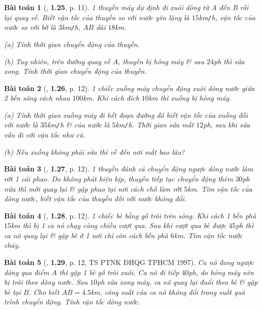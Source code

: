 \documentclass{article}
\numberwithin{equation}{section}
\newtheorem{baitoan}{Bài toán}[section]
\begin{document}
\begin{baitoan}[\cite{Van2022}, \textbf{1.25}, p. 11]
	1 thuyền máy dự định đi xuôi dòng từ A đến B rồi lại quay về. Biết vận tốc của thuyền so với nước yên lặng là $15$\emph{km\texttt{/}h}, vận tốc của nước so với bờ là $3$\emph{km\texttt{/}h}, $AB$ dài $18$\emph{km}.
	\begin{enumerate*}
		\item[(a)] Tính thời gian chuyển động của thuyền.
		\item[(b)] Tuy nhiên, trên đường quay về $A$, thuyền bị hỏng máy \& sau $24$\emph{ph} thì sửa xong. Tính thời gian chuyển động của thuyền.
	\end{enumerate*}
\end{baitoan}

\begin{baitoan}[\cite{Van2022}, \textbf{1.26}, p. 12]
	1 chiếc xuồng máy chuyển động xuôi dòng nước giữa 2 bến sông cách nhau $100$\emph{km}. Khi cách đích $10$\emph{km} thì xuồng bị hỏng máy.
	\begin{enumerate*}
		\item[(a)] Tính thời gian xuồng máy đi hết đoạn đường đó biết vận tốc của xuồng đối với nước là $35$\emph{km\texttt{/}h} \& của nước là $5$\emph{km\texttt{/}h}. Thời gian sửa mất $12$\emph{ph}, sau khi sửa vẫn đi với vận tốc như cũ.
		\item[(b)] Nếu xuồng không phải sửa thì về đến nơi mất bao lâu?
	\end{enumerate*}
\end{baitoan}

\begin{baitoan}[\cite{Van2022}, \textbf{1.27}, p. 12]
	1 thuyền đánh cá chuyển động ngược dòng nước làm rớt 1 cái phao. Do không phát hiện kịp, thuyền tiếp tục chuyển động thêm $30$\emph{ph} nữa thì mới quay lại \& gặp phao tại nơi cách chỗ làm rớt $5$\emph{km}. Tìm vận tốc của dòng nước, biết vận tốc của thuyền đối với nước không đổi.
\end{baitoan}

\begin{baitoan}[\cite{Van2022}, \textbf{1.28}, p. 12]
	1 chiếc bè bằng gỗ trôi trên sông. Khi cách 1 bến phà $15$\emph{km} thì bị 1 ca nô chạy cùng chiều vượt qua. Sau khi vượt qua bè được $45$\emph{ph} thì ca nô quay lại \& gặp bè ở 1 nơi chỉ còn cách bến phà $6$\emph{km}. Tìm vận tốc nước chảy.
\end{baitoan}

\begin{baitoan}[\cite{Van2022}, \textbf{1.29}, p. 12, TS PTNK ĐHQG TPHCM 1997]
	Ca nô đang ngược dòng qua điểm $A$ thì gặp 1 bè gỗ trôi xuôi. Ca nô đi tiếp $40$\emph{ph}, do hỏng máy nên bị trôi theo dòng nước. Sau $10$\emph{ph} sửa xong máy, ca nô quay lại đuổi theo bè \& gặp bè tại $B$. Cho biết $AB = 4.5$\emph{km}, công suất của ca nô không đổi trong suốt quá trình chuyển động. Tính vận tốc dòng nước.
\end{baitoan}
\end{document}
